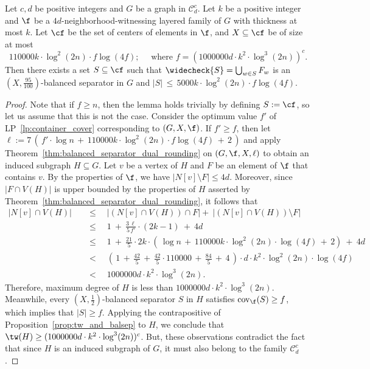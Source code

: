 \begin{lemma}\label{lem:F_balanced_separator}
    Let $c,d$ be positive integers and $G$ be a graph in $\mathcal{C}^c_d$. Let $k$ be a positive integer and $\f$ be a $4d$-neighborhood-witnessing layered family of $G$ with thickness at most $k$. Let $\cf$ be the set of centers of elements in $\f$, and $X\subseteq\cf$ be of size at most 
    $$
    110000k\cdot \log^2(2n)\cdot f\log (4f);\quad 
    \text{ where }
    f = (1000000d\cdot k^2\cdot \log^3 (2n))^{c}.
    $$  
    Then there exists a set $S\subseteq\cf$ such that $\widecheck{S} = \bigcup_{w \in S} F_w$ is an $(X,\frac{95}{100})$-balanced separator in $G$ and $|S|\, \leq\, 5000k\cdot \log^2(2n)\cdot f\log (4f)$.
\end{lemma}
\begin{proof}
    Note that if $f\geq n$, then the lemma holds trivially by defining $S := \cf$, so let us assume that this is not the case. Consider the optimum value $f'$ of LP~\ref{lp:container_cover} corresponding to $(G,X,\f)$. 
    If $f'\geq f$, then let $\ell := 7\, (\,f'\cdot\log n\, +\, 110000k\cdot \log^2(2n)\cdot f\log (4f)\, +\, 2\,)$ and apply Theorem~\ref{thm:balanced_separator_dual_rounding} on $(G,\f,X,\ell)$ to obtain an induced subgraph $H \subseteq G$. Let $v$ be a vertex of $H$ and $F$ be an element of $\f$ that contains $v$. 
    By the properties of $\f$, we have $|N[v] \setminus F| \leq 4d$. Moreover, since $|F \cap V(H)|$ is upper bounded by the properties of $H$ asserted by Theorem~\ref{thm:balanced_separator_dual_rounding}, it follows that
    \begin{align*}
    |N[v] \cap V(H)| \quad 
    &\leq \quad |(N[v] \cap V(H))\cap F| +\ |(N[v] \cap V(H))\setminus F|\\
    &\leq \quad 1\ +\ \frac{3\, \ell}{5\, f'}\cdot (2k - 1)\ +\ 4d\\
    &\leq \quad 1\ +\ \frac{21}{5}\cdot 2k\cdot (\,\log n\, +\, 110000k\cdot \log^2(2n)\cdot \log (4f)\, +\, 2)\ +\ 4d\\
    &< \quad (\, 1\, +\, \frac{42}{5}\, +\, \frac{42}{5}\cdot 110000\, +\, \frac{84}{5}\, +\, 4\, ) \cdot d\cdot k^2\cdot \log^2(2n)\cdot \log (4f)\\
    &< \quad 1000000d \cdot k^2 \cdot \log^3 (2n).
    \end{align*}
    Therefore, maximum degree of $H$ is less than $1000000d \cdot k^2 \cdot \log^3 (2n)$. 
    Meanwhile, every $(X,\frac{1}{2})$-balanced separator $S$ in $H$ satisfies $\mathrm{cov}_{\f}(S) \geq f$, which implies that $|S| \geq f$. Applying the contrapositive of Proposition~\ref{prop:tw_and_balsep} to $H$, we conclude that $\tw(H) \geq (1000000d\cdot k^2\cdot \log^3 (2n))^{c}$. 
    But, these observations contradict the fact that since $H$ is an induced subgraph of $G$, it must also belong to the family $\mathcal{C}^c_d$. 
    

\end{proof}

